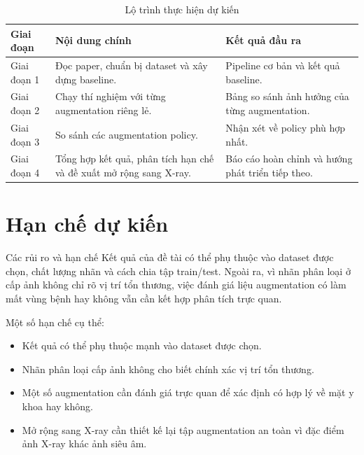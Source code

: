 \documentclass[12pt,a4paper]{article}
\begin{document}
\begin{table}[H]
\centering
\caption{Lộ trình thực hiện dự kiến}
\renewcommand{\arraystretch}{1.25}
\begin{tabular}{p{2.5cm} p{6.5cm} p{6cm}}
\toprule
\textbf{Giai đoạn} & \textbf{Nội dung chính} & \textbf{Kết quả đầu ra} \\
\midrule
Giai đoạn 1 & Đọc paper, chuẩn bị dataset và xây dựng baseline. & Pipeline cơ bản và kết quả baseline. \\
Giai đoạn 2 & Chạy thí nghiệm với từng augmentation riêng lẻ. & Bảng so sánh ảnh hưởng của từng augmentation. \\
Giai đoạn 3 & So sánh các augmentation policy. & Nhận xét về policy phù hợp nhất. \\
Giai đoạn 4 & Tổng hợp kết quả, phân tích hạn chế và đề xuất mở rộng sang X-ray. & Báo cáo hoàn chỉnh và hướng phát triển tiếp theo. \\
\bottomrule
\end{tabular}
\end{table}

\section{Hạn chế dự kiến}

\begin{riskbox}{Các rủi ro và hạn chế}
Kết quả của đề tài có thể phụ thuộc vào dataset được chọn, chất lượng nhãn và cách chia tập train/test. Ngoài ra, vì nhãn phân loại ở cấp ảnh không chỉ rõ vị trí tổn thương, việc đánh giá liệu augmentation có làm mất vùng bệnh hay không vẫn cần kết hợp phân tích trực quan.
\end{riskbox}

Một số hạn chế cụ thể:

\begin{itemize}
    \item Kết quả có thể phụ thuộc mạnh vào dataset được chọn.
    \item Nhãn phân loại cấp ảnh không cho biết chính xác vị trí tổn thương.
    \item Một số augmentation cần đánh giá trực quan để xác định có hợp lý về mặt y khoa hay không.
    \item Mở rộng sang X-ray cần thiết kế lại tập augmentation an toàn vì đặc điểm ảnh X-ray khác ảnh siêu âm.
\end{itemize}

\end{document}
